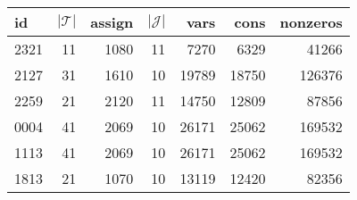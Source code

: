\begin{tabular}{lrrrrrr}
\toprule
   id &  $|\mathcal{T}|$ &  assign &  $|\mathcal{J}|$ &  vars &  cons &  nonzeros \\
\midrule
 2321 &               11 &    1080 &               11 &  7270 &  6329 &     41266 \\
 2127 &               31 &    1610 &               10 & 19789 & 18750 &    126376 \\
 2259 &               21 &    2120 &               11 & 14750 & 12809 &     87856 \\
 0004 &               41 &    2069 &               10 & 26171 & 25062 &    169532 \\
 1113 &               41 &    2069 &               10 & 26171 & 25062 &    169532 \\
 1813 &               21 &    1070 &               10 & 13119 & 12420 &     82356 \\
\bottomrule
\end{tabular}
